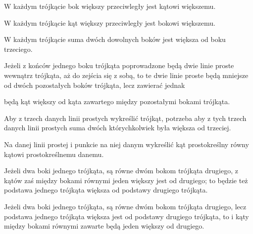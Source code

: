 \begin{euclid_theorem}
    W każdym trójkącie bok większy przeciwległy jest kątowi większemu.
\end{euclid_theorem}

\begin{euclid_theorem}
    W każdym trójkącie kąt większy przeciwległy jest bokowi większemu.
\end{euclid_theorem}

\begin{euclid_theorem}
    W każdym trójkącie suma dwóch dowolnych boków jest większa od boku trzeciego.
\end{euclid_theorem}

\begin{euclid_theorem}
    Jeżeli z końców jednego boku trójkąta poprowadzone będą dwie linie proste wewnątrz trójkąta, aż do zejścia się z sobą, to te dwie linie proste będą mniejsze od dwóch pozostałych boków trójkąta, lecz zawierać jednak 
\end{euclid_theorem}
będą kąt większy od kąta zawartego między pozostałymi bokami trójkąta.
\begin{euclid_theorem}
    Aby z trzech danych linii prostych wykreślić trójkąt, potrzeba aby z tych trzech danych linii prostych suma dwóch którychkolwiek była większa od trzeciej.
\end{euclid_theorem}

\begin{euclid_theorem}
    Na danej linii prostej i punkcie na niej danym wykreślić kąt prostokreślny równy kątowi prostokreślnemu danemu.
\end{euclid_theorem}

\begin{euclid_theorem}
    Jeżeli dwa boki jednego trójkąta, są równe dwóm bokom trójkąta drugiego, z kątów zaś między bokami równymi jeden większy jest od drugiego; to będzie też podstawa jednego trójkąta większa od podstawy drugiego trójkąta.
\end{euclid_theorem}

\begin{euclid_theorem}
    Jeżeli dwa boki jednego trójkąta, są równe dwóm bokom trójkąta drugiego, lecz podstawa jednego trójkąta większa jest od podstawy drugiego trójkąta, to i kąty między bokami równymi zawarte będą jeden większy od drugiego.
\end{euclid_theorem}

